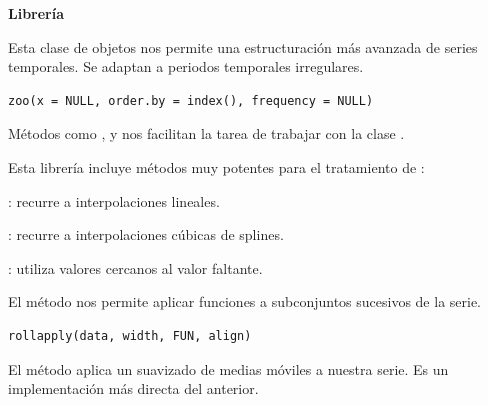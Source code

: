\documentclass[10pt,a4paper,twoside]{beamer}
\begin{document}
\begin{frame}[fragile]
\textbf{Librería }

\begin{itemize*}
\item Esta clase de objetos nos permite una estructuración más avanzada de series temporales. Se adaptan a periodos temporales irregulares.
    \begin{Verbatim}[fontsize=\footnotesize]
    zoo(x = NULL, order.by = index(), frequency = NULL)
    \end{Verbatim}
\item Métodos como ,  y  nos facilitan la tarea de trabajar con la clase .
\item Esta librería incluye métodos muy potentes para el tratamiento de :
    \begin{itemize*}
    \item {}: recurre a interpolaciones lineales.
    \item {}: recurre a interpolaciones cúbicas de splines.
    \item {}: utiliza valores cercanos al valor faltante.
    \end{itemize*}
\item El método  nos permite aplicar funciones a subconjuntos sucesivos de la serie.
    \begin{Verbatim}[fontsize=\footnotesize]
    rollapply(data, width, FUN, align)
    \end{Verbatim}
\item El método  aplica un suavizado de medias móviles a nuestra serie. Es un implementación más directa del anterior.
\end{itemize*}

\end{frame}

\end{document}
